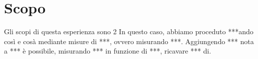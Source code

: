 \section*{Scopo}

Gli scopi di questa esperienza sono 2
In questo caso, abbiamo proceduto ***ando così e cosà mediante misure di ***, ovvero misurando ***.
Aggiungendo *** nota a *** è possibile, misurando *** in funzione di ***, ricavare *** di.
